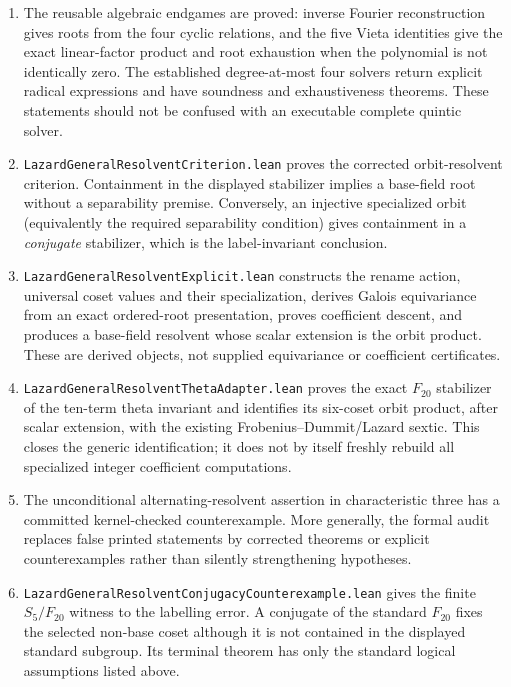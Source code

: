 \documentclass[11pt,a4paper,oneside]{article}
\begin{document}
\begin{enumerate}
\item The reusable algebraic endgames are proved: inverse Fourier
  reconstruction gives roots from the four cyclic relations, and the five
  Vieta identities give the exact linear-factor product and root exhaustion
  when the polynomial is not identically zero.  The established degree-at-most
  four solvers return explicit radical expressions and have soundness and
  exhaustiveness theorems.  These statements should not be confused with an
  executable complete quintic solver.
\item \texttt{LazardGeneralResolventCriterion.lean} proves the corrected
  orbit-resolvent criterion.  Containment in the displayed stabilizer implies
  a base-field root without a separability premise.  Conversely, an injective
  specialized orbit (equivalently the required separability condition) gives
  containment in a \emph{conjugate} stabilizer, which is the label-invariant
  conclusion.
\item \texttt{LazardGeneralResolventExplicit.lean} constructs the rename
  action, universal coset values and their specialization, derives Galois
  equivariance from an exact ordered-root presentation, proves coefficient
  descent, and produces a base-field resolvent whose scalar extension is the
  orbit product.  These are derived objects, not supplied equivariance or
  coefficient certificates.
\item \texttt{LazardGeneralResolventThetaAdapter.lean} proves the exact
  $F_{20}$ stabilizer of the ten-term theta invariant and identifies its
  six-coset orbit product, after scalar extension, with the existing
  Frobenius--Dummit/Lazard sextic.  This closes the generic identification; it
  does not by itself freshly rebuild all specialized integer coefficient
  computations.
\item The unconditional alternating-resolvent assertion in characteristic
  three has a committed kernel-checked counterexample.  More generally, the
  formal audit replaces false printed statements by corrected theorems or
  explicit counterexamples rather than silently strengthening hypotheses.
\item \texttt{LazardGeneralResolventConjugacyCounterexample.lean} gives the
  finite $S_5/F_{20}$ witness to the labelling error.  A conjugate of the
  standard $F_{20}$ fixes the selected non-base coset although it is not
  contained in the displayed standard subgroup.  Its terminal theorem has
  only the standard logical assumptions listed above.

\end{enumerate}
\end{document}
